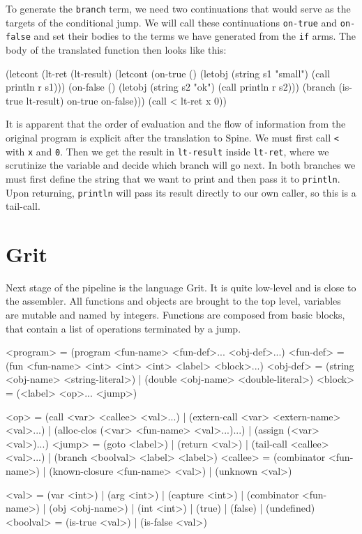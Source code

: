 To generate the \texttt{branch} term, we need two continuations that would serve
as the targets of the conditional jump. We will call these continuations
\texttt{on-true} and \texttt{on-false} and set their bodies to the terms
we have generated from the \texttt{if} arms. The body of the translated function
then looks like this:

\begin{spine}
(letcont (lt-ret (lt-result)
            (letcont (on-true ()
                        (letobj (string s1 "small") (call println r s1)))
                     (on-false ()
                        (letobj (string s2 "ok") (call println r s2)))
              (branch (is-true lt-result) on-true on-false)))
  (call < lt-ret x 0))
\end{spine}

It is apparent that the order of evaluation and the flow of information from the
original program is explicit after the translation to Spine. We must first call
\texttt{<} with \texttt{x} and \texttt{0}. Then we get the result in
\texttt{lt-result} inside \texttt{lt-ret}, where we scrutinize the variable and
decide which branch will go next. In both branches we must first define the
string that we want to print and then pass it to \texttt{println}. Upon
returning, \texttt{println} will pass its result directly to our own caller, so
this is a tail-call.

\section{Grit}

Next stage of the pipeline is the language Grit. It is quite low-level and is
close to the assembler. All functions and objects are brought to the top level,
variables are mutable and named by integers. Functions are composed from basic
blocks, that contain a list of operations terminated by a jump.

\begin{gram}
<program>   = (program <fun-name> <fun-def>... <obj-def>...)
<fun-def>   = (fun <fun-name> <int> <int> <int> <label> <block>...)
<obj-def>   = (string <obj-name> <string-literal>)
            | (double <obj-name> <double-literal>)
<block>     = (<label> <op>... <jump>)

<op>        = (call <var> <callee> <val>...)
            | (extern-call <var> <extern-name> <val>...)
            | (alloc-clos (<var> <fun-name> <val>...)...)
            | (assign (<var> <val>)...)
<jump>      = (goto <label>)
            | (return <val>)
            | (tail-call <callee> <val>...)
            | (branch <boolval> <label> <label>)
<callee>    = (combinator <fun-name>)
            | (known-closure <fun-name> <val>)
            | (unknown <val>)

<val>       = (var <int>)
            | (arg <int>)
            | (capture <int>)
            | (combinator <fun-name>)
            | (obj <obj-name>)
            | (int <int>)
            | (true)
            | (false)
            | (undefined)
<boolval>   = (is-true <val>) | (is-false <val>)
\end{gram}

